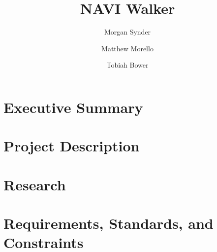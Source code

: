\documentclass[12pt, letterpaper]{article}
\title{NAVI Walker}
\author{Morgan Synder \and Matthew Morello \and Tobiah Bower}
\begin{document}
	

	\tableofcontents

	\newpage
	\section{Executive Summary}
	
	
	\section{Project Description}
	
	
	
	
	
	
	\section{Research}
	
	
	
	
	
	
	\section{Requirements, Standards, and Constraints}
	
	
	
	
	
	
	
\end{document}
